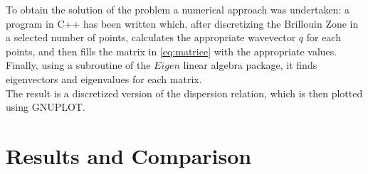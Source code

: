 \documentclass{article}
\begin{document}
\medskip

To obtain the solution of the problem a numerical approach was undertaken: a program in C++ has been written which, after discretizing the Brillouin Zone in a selected number of points, calculates the appropriate wavevector $q$ for each points, and then fills the matrix in \autoref{eq:matrice} with the appropriate values. Finally, using a subroutine of the $Eigen$ linear algebra package, it finds eigenvectors and eigenvalues for each matrix.\\
The result is a discretized version of the dispersion relation, which is then plotted using GNUPLOT. \par

\section*{Results and Comparison} 
\end{document}
